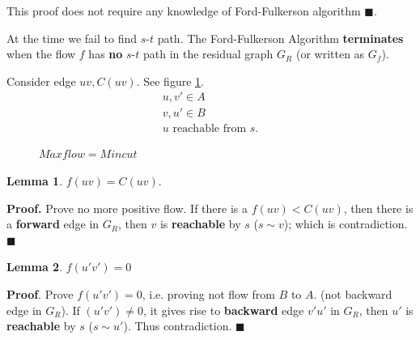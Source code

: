 \documentclass[a4paper]{report}
\theoremstyle{definition}
\newtheorem{lem}{Lemma}[section]
\begin{document}
This proof does not require any knowledge of Ford-Fulkerson algorithm $\blacksquare$.

At the time we fail to find $s$-$t$ path. The Ford-Fulkerson Algorithm \textbf{terminates} when the flow $f$ has \textbf{no} $s$-$t$ path in the residual graph $G_R$ (or written as $G_f$).

Consider edge $uv, C(uv)$. See figure \ref{fig:7_5}.
\begin{align*}
u,v' \in A\\
v,u' \in B \\
u \text{ reachable from } s.
\end{align*}
\begin{figure}[!htp]
\centering
{}
\caption{$Maxflow = Mincut$}
\label{fig:7_5}
\end{figure}

\begin{lem}
 $f(uv)=C(uv)$.
\end{lem}
\textbf{Proof.} Prove no more positive flow. If there is a $f(uv)< C(uv)$, then there is a \textbf{forward} edge in $G_R$, then $v$ is \textbf{reachable} by $s$ ($s\sim v$); which is contradiction. $\blacksquare$

\begin{lem}
$f(u'v')=0$
\end{lem}
\textbf{Proof}. Prove $f(u'v')=0$, i.e. proving not flow from $B$ to $A$. (not backward edge in $G_R$). If $(u'v')\neq 0$, it gives rise to \textbf{backward} edge $v'u'$ in $G_R$, then $u'$ is \textbf{reachable} by $s$ ($s\sim u'$). Thus contradiction. $\blacksquare$
\end{document}

